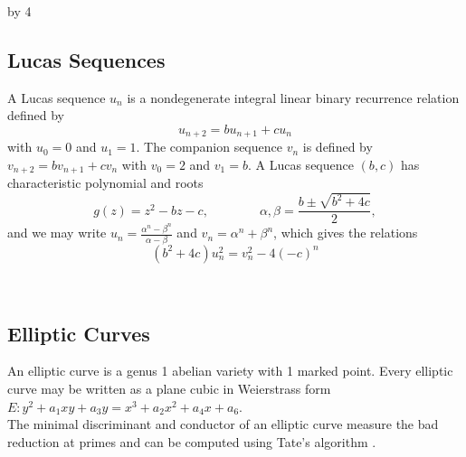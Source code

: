 \documentclass[12pt]{scrartcl}
\def\H{{\mathbb H}}
\def\Z{{\mathbb Z}}
\newcommand{\SL}{\text{SL}}
\def\anzspalten{4}
\newlength{\kastenwidth}
\newenvironment{kasten}{%
  \begin{lrbox}{\dummybox}%
    \begin{minipage}{0.96\linewidth}}%
    {\end{minipage}%
  \end{lrbox}%
  \raisebox{-\depth}{\psshadowbox[framesep=1em]{\usebox{\dummybox}}}\\[0.5em]}
\newenvironment{spalte}{%
  \setlength\kastenwidth{1.2\textwidth}
  \divide\kastenwidth by \anzspalten
  \begin{minipage}[t]{\kastenwidth}}{\end{minipage}\hfill}
\begin{document}
\begin{lrbox}{\spalten}
{\begin{spalte}
\begin{kasten}


\subsection*{\color{blue} Lucas Sequences}
A Lucas sequence $u_n$ is a nondegenerate integral linear binary recurrence relation defined by
\[u_{n+2} = bu_{n+1} + cu_n\]
with $u_0=0$ and $u_1 = 1$.  
The companion sequence $v_n$ is defined by $v_{n+2} = bv_{n+1} + cv_n$ with $v_0=2$ and $v_1 = b$.
A Lucas sequence $(b,c)$ has characteristic polynomial and roots
\[ g(z) = z^2 - bz - c, \qquad \qquad \alpha, \beta = \frac{b \pm \sqrt{b^2+4c}}{2},\]
and we may write
$u_n = \frac{\alpha^n - \beta^n}{\alpha - \beta}$ and $v_n = \alpha^n +\beta^n$, which gives the relations
\[(b^2+4c)u_n^2 = v_n^2 - 4(-c)^n\]

\end{kasten}

\begin{kasten}

\subsection*{\color{blue} Elliptic Curves}

An elliptic curve is a genus 1 abelian variety with 1 marked point.  Every elliptic curve may be written as a plane cubic in Weierstrass form $E \colon y^2 + a_1xy +a_3y = x^3 +a_2x^2 + a_4x +a_6$.  \\

The minimal discriminant and conductor of an elliptic curve measure the bad reduction at primes and can be computed using Tate's algorithm \cite{tate}.



\end{kasten}
\end{spalte}}
\end{lrbox}
\end{document}
